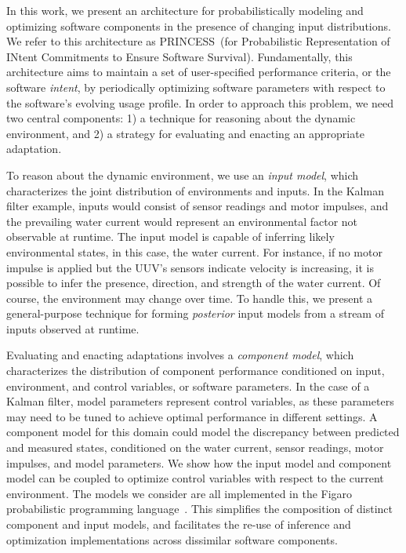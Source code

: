 \documentclass[letterpaper]{article}
\newcommand{\mname}{PRINCESS~}
\begin{document}

In this work, we present an architecture for probabilistically modeling and optimizing software components in the presence of changing input distributions.
We refer to this architecture as \mname (for Probabilistic Representation of INtent Commitments to Ensure Software Survival).
Fundamentally, this architecture aims to maintain a set of user-specified performance criteria, or the software \emph{intent}, by periodically optimizing software parameters with respect to the software's evolving usage profile.
In order to approach this problem, we need two central components: 1) a technique for reasoning about the dynamic environment, and 2) a strategy for evaluating and enacting an appropriate adaptation.

To reason about the dynamic environment, we use an \emph{input model}, which characterizes the joint distribution of environments and inputs.
In the Kalman filter example, inputs would consist of sensor readings and motor impulses, and the prevailing water current would represent an environmental factor not observable at runtime.
The input model is capable of inferring likely environmental states, in this case, the water current.
For instance, if no motor impulse is applied but the UUV's sensors indicate velocity is increasing, it is possible to infer the presence, direction, and strength of the water current.
Of course, the environment may change over time. To handle this, we present a general-purpose technique for forming \emph{posterior} input models from a stream of inputs observed at runtime.

Evaluating and enacting adaptations involves a \emph{component model}, which characterizes the distribution of component performance conditioned on input, environment, and control variables, or software parameters.
In the case of a Kalman filter, model parameters represent control variables, as these parameters may need to be tuned to achieve optimal performance in different settings. A component model for this domain could model the discrepancy between predicted and measured states, conditioned on the water current, sensor readings, motor impulses, and model parameters.
We show how the input model and component model can be coupled to optimize control variables with respect to the current environment. 
The models we consider are all implemented in the Figaro probabilistic programming language~\cite{pfeffer2010practical}.
This simplifies the composition of distinct component and input models, and facilitates the re-use of inference and optimization implementations across dissimilar software components.
\end{document}
